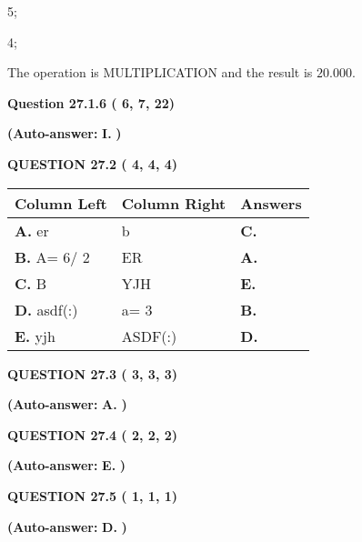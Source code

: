 \documentclass[12pt]{article}
\begin{document}
5;
 
4;
 
The operation is  %
MULTIPLICATION and the result is
$ %
20.000$.
 
  
  
{\textbf{\large{Question
27.1.6 
 (          6,          7,         22)
}}}
 
 
{\textbf{(Auto-answer:}}
{\textbf{\large{
I.}}}
{\textbf{)}}
 
 
  
  
{\textbf{\large{QUESTION
27.2 
 (          4,          4,          4)
}}}
 
 
\noindent{}
  
  
\begin{tabular}{|l|l|l|}
 \hline
 Column Left & Column Right  & Answers       \\ 
 \hline
{\textbf{\large{
A.}}}
er
  & 
b
 & 
{\textbf{\large{
C.}}}
 \\ 
 \hline
{\textbf{\large{
B.}}}
 A= %
6/ %
2

  & 
ER
 & 
{\textbf{\large{
A.}}}
 \\ 
 \hline
{\textbf{\large{
C.}}}
B
  & 
YJH
 & 
{\textbf{\large{
E.}}}
 \\ 
 \hline
{\textbf{\large{
D.}}}
asdf(:)
  & 
 a= %
3
 & 
{\textbf{\large{
B.}}}
 \\ 
 \hline
{\textbf{\large{
E.}}}
yjh
  & 
ASDF(:)
 & 
{\textbf{\large{
D.}}}
 \\ 
 \hline
 \end{tabular}
  
  
\noindent{}
 
 
  
  
{\textbf{\large{QUESTION
27.3 
 (          3,          3,          3)
}}}
 
 
{\textbf{(Auto-answer:}}
{\textbf{\large{
A.}}}
{\textbf{)}}
 
 
  
  
{\textbf{\large{QUESTION
27.4 
 (          2,          2,          2)
}}}
 
 
{\textbf{(Auto-answer:}}
{\textbf{\large{
E.}}}
{\textbf{)}}
 
 
  
  
{\textbf{\large{QUESTION
27.5 
 (          1,          1,          1)
}}}
 
 
{\textbf{(Auto-answer:}}
{\textbf{\large{
D.}}}
{\textbf{)}}
 
\end{document}
